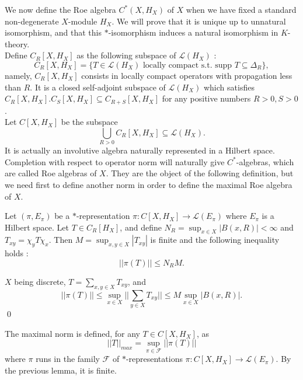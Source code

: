 
We now define the Roe algebra $C^*(X, H_X)$ of $X$ when we have fixed a standard non-degenerate $X$-module $H_X$. We will prove that it is unique up to unnatural isomorphism, and that this $*$-isomorphism induces a natural isomorphism in $K$-theory.\\

Define $C_R[X,H_X]$ as the following subspace of $\mathcal L(H_X)$ :
\[C_R[X,H_X] = \{T\in \mathcal L(H_X) \text{ locally compact  s.t. supp }T\subseteq \Delta_R \},\]
namely, $C_R[X,H_X]$ consists in locally compact operators with propagation less than $R$. It is a closed self-adjoint subspace of $\mathcal L(H_X)$ which satisfies $C_R[X,H_X].C_S[X,H_X]\subseteq C_{R+S}[X,H_X]$ for any positive numbers $R>0,S>0$.\\

Let $C[X,H_X]$ be the subspace 
\[\bigcup_{R>0} C_R[X,H_X]\subseteq \mathcal L(H_X).\] 
It is actually an involutive algebra naturally represented in a Hilbert space. Completion with respect to operator norm will naturally give $C^*$-algebras, which are called Roe algebras of $X$. They are the object of the following definition, but we need first to define another norm in order to define the maximal Roe algebra of $X$.\\

\begin{lem}
Let $(\pi, E_\pi)$ be a $*$-representation $\pi : C[X,H_X]\rightarrow \mathcal L(E_\pi)$ where $E_\pi$ is a Hilbert space. Let $T\in C_R[H_X]$, and define $N_R =\sup_{x\in X} |B(x,R)|<\infty$ and $T_{xy} = \chi_y T \chi_x$. Then $M=\sup_{x,y\in X} |T_{xy}|$ is finite and the following inequality holds :
\[||\pi(T)||\leq N_R M.\] 
\end{lem}
\begin{dem}
$X$ being discrete, $T=\sum_{x,y\in X} T_{xy}$, and 
\[||\pi(T)||\leq \sup_{x\in X} ||\sum_{y\in X} T_{xy}||\leq M \sup_{x\in X} |B(x,R)|.\]
\qed
\end{dem}

The maximal norm is defined, for any $T\in C[X,H_X]$, as 
\[||T||_{max} = \sup_{\pi\in\mathcal F} ||\pi(T)||\]
where $\pi$ runs in the family $\mathcal F$ of $*$-representations $\pi : C[X,H_X]\rightarrow \mathcal L(E_\pi)$. By the previous lemma, it is finite. 

